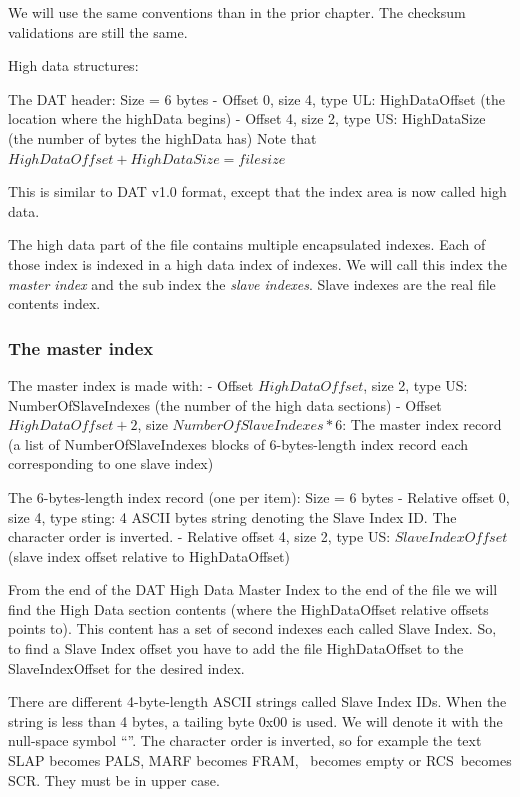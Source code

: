 \documentclass{article}
\begin{document}
 We will use the same conventions than in the prior chapter.
 The checksum validations are still the same.

 High data structures:

 The DAT header: Size = 6 bytes
  - Offset 0, size 4, type UL: HighDataOffset
           (the location where the highData begins)
  - Offset 4, size 2, type US: HighDataSize
           (the number of bytes the highData has)
           Note that $HighDataOffset+HighDataSize=file size$

 This is similar to DAT v1.0 format, except that the index area is now
 called high data.

 The high data part of the file contains multiple encapsulated indexes.
 Each of those index is indexed in a high data index of indexes. We will
 call this index the  {\it master index} and the sub index the  {\it slave indexes}.
 Slave indexes are the real file contents index.

\subsubsection{The master index} %
 The master index is made with:
  - Offset $HighDataOffset$,   size 2, type US: NumberOfSlaveIndexes
           (the number of the high data sections)
  - Offset $HighDataOffset+2$, size $NumberOfSlaveIndexes*6$: The master index
           record (a list of NumberOfSlaveIndexes blocks of 6-bytes-length
           index record each corresponding to one slave index)

 The 6-bytes-length index record (one per item): Size = 6 bytes
  - Relative offset 0, size 4, type sting: 4 ASCII bytes string denoting
           the Slave Index ID. The character order is inverted.
  - Relative offset 4, size 2, type US: $SlaveIndexOffset$
           (slave index offset relative to HighDataOffset)

 From the end of the  DAT High Data Master Index to the end of the file
 we will find the High Data section contents (where the HighDataOffset
 relative offsets points to). This content has a set of second indexes
 each called Slave Index. So, to find a Slave Index offset you have to
 add the file HighDataOffset to the SlaveIndexOffset for the desired
 index.

 There are different 4-byte-length ASCII strings called Slave Index IDs.
 When the string is less than 4 bytes, a tailing byte 0x00 is used. We will
 denote it with the null-space symbol ``\textvisiblespace''. The character order is inverted, so
 for example the text SLAP becomes PALS, MARF becomes FRAM, \textvisiblespace\textvisiblespace\textvisiblespace\textvisiblespace
 \ becomes empty or RCS\textvisiblespace \ becomes SCR. They must be in upper case.
\end{document}

